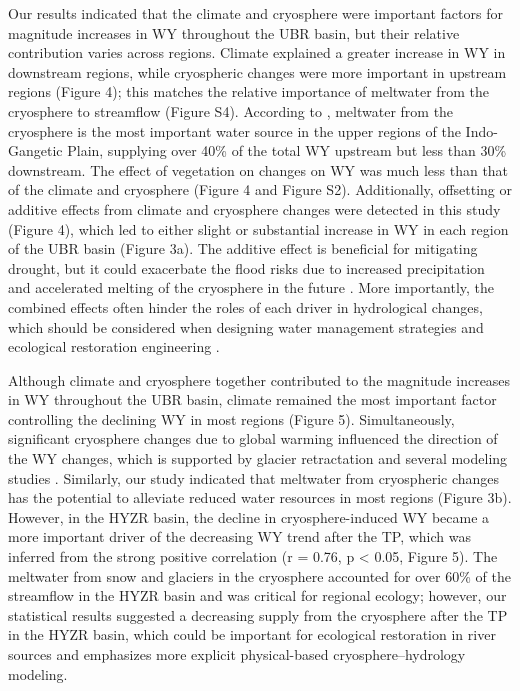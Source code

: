 \documentclass[hess, manuscript]{copernicus}
\begin{document}
Our results indicated that the climate and cryosphere were important factors for magnitude increases in WY throughout the UBR basin, but their relative contribution varies across regions. Climate explained a greater increase in WY in downstream regions, while cryospheric changes were more important in upstream regions (Figure 4); this matches the relative importance of meltwater from the cryosphere to streamflow (Figure S4). According to \citet{biemans2019importance}, meltwater from the cryosphere is the most important water source in the upper regions of the Indo-Gangetic Plain, supplying over 40\% of the total WY upstream but less than 30\% downstream. The effect of vegetation on changes on WY was much less than that of the climate and cryosphere (Figure 4 and Figure S2). Additionally, offsetting or additive effects from climate and cryosphere changes were detected in this study (Figure 4), which led to either slight or substantial increase in WY in each region of the UBR basin (Figure 3a). The additive effect is beneficial for mitigating drought, but it could exacerbate the flood risks due to increased precipitation and accelerated melting of the cryosphere in the future \citep{Immerzeel2013}. More importantly, the combined effects often hinder the roles of each driver in hydrological changes, which should be considered when designing water management strategies and ecological restoration engineering \citep{wei2018,zhang2021deforestation}.

Although climate and cryosphere together contributed to the magnitude increases in WY throughout the UBR basin, climate remained the most important factor controlling the declining WY in most regions (Figure 5). Simultaneously, significant cryosphere changes due to global warming influenced the direction of the WY changes, which is supported by glacier retractation \citep{yao2010glacial} and several modeling studies \citep{lutz2014consistent,Zhang2020VariationOM, wang2021tp, wang2021vanishing}. Similarly, our study indicated that meltwater from cryospheric changes has the potential to alleviate reduced water resources in most regions (Figure 3b). However, in the HYZR basin, the decline in cryosphere-induced WY became a more important driver of the decreasing WY trend after the TP, which was inferred from the strong positive correlation (r = 0.76, p < 0.05, Figure 5). The meltwater from snow and glaciers in the cryosphere accounted for over 60\% of the streamflow in the HYZR basin \citep{biemans2019importance} and was critical for regional ecology; however, our statistical results suggested a decreasing supply from the cryosphere after the TP in the HYZR basin, which could be important for ecological restoration in river sources and emphasizes more explicit physical-based cryosphere--hydrology modeling.
\end{document}
